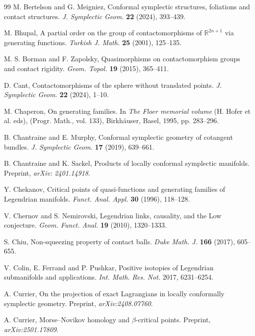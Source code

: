 \documentclass{amsart}
\theoremstyle{remark}
\begin{document}
\begin{thebibliography}{99}
 M. Bertelson and G. Meigniez, Conformal symplectic structures, foliations and contact structures. \textit{J. Symplectic Geom.} \textbf{22} (2024), 393--439.

 M. Bhupal, A partial order on the group of contactomorphisms of $\mathbb{R}^{2n+1}$ via generating functions. \textit{Turkish J. Math.} \textbf{25} (2001), 125--135.

 M. S. Borman and F. Zapolsky, Quasimorphisms on contactomorphism groups and contact rigidity. \textit{Geom. Topol.} \textbf{19} (2015), 365--411. 

 D. Cant, Contactomorphisms of the sphere without translated points. \textit{J. Symplectic Geom.} \textbf{22} (2024), 1--10.

 M. Chaperon, On generating families. In \textit{The Floer memorial volume} (H. Hofer et al. eds), (Progr. Math., vol. 133), Birkh\"auser, Basel, 1995, pp. 283–296.

 B. Chantraine and E. Murphy, Conformal symplectic geometry of cotangent bundles. \textit{J. Symplectic Geom.} \textbf{17} (2019), 639--661.

 B. Chantraine and K. Sackel, Products of locally conformal symplectic manifolds. Preprint, \textit{arXiv: 2401.14918}.

 Y. Chekanov, Critical points of quasi-functions and generating families of Legendrian manifolds. \textit{Funct. Anal. Appl.} \textbf{30} (1996), 118–128.

 V. Chernov and S. Nemirovski, Legendrian links, causality, and the Low conjecture. \textit{Geom. Funct. Anal.} \textbf{19} (2010), 1320--1333.

 S. Chiu, Non-squeezing property of contact balls. \textit{Duke Math. J.} \textbf{166} (2017), 605--655.

 V. Colin, E. Ferrand and P. Pushkar, Positive isotopies of Legendrian submanifolds and applications. \textit{Int. Math. Res. Not.} 2017, 6231--6254.

 A. Currier, On the projection of exact Lagrangians in locally conformally symplectic geometry. Preprint, \textit{arXiv:2408.07760}.

 A. Currier, Morse--Novikov homology and $\beta$-critical points. Preprint, \textit{arXiv:2501.17809}.


\end{thebibliography}
\end{document}
